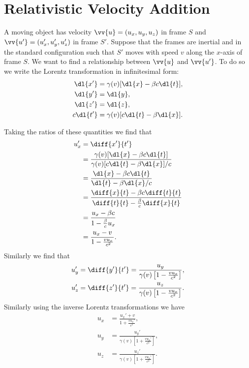 \documentclass[fleqn]{NotesClass}
\begin{document}
    \section{Relativistic Velocity Addition}\label{sec:relativisitic velocity addition}
    A moving object has velocity \(\vv{u} = (u_x, u_y, u_z)\) in frame \(S\) and \(\vv{u'} = (u'_x, u'_y, u'_z)\) in frame \(S'\).
    Suppose that the frames are inertial and in the standard configuration such that \(S'\) moves with speed \(v\) along the \(x\)-axis of frame \(S\).
    We want to find a relationship between \(\vv{u}\) and \(\vv{u'}\).
    To do so we write the Lorentz transformation in infinitesimal form:
    \begin{align}
        \dl{x'} &= \gamma(v)[\dl{x} - \beta c \dl{t}],\\
        \dl{y'} &= \dl{y},\\
        \dl{z'} &= \dl{z},\\
        c\dl{t'} &= \gamma(v)[c\dl{t} - \beta\dl{x}].
    \end{align}
    
    Taking the ratios of these quantities we find that
    \begin{align}
        u'_x &= \diff{x'}{t'}\\
        &= \frac{\gamma(v)[\dl{x} - \beta c \dl{t}]}{\gamma(v)[c\dl{t} - \beta\dl{x}]/c}\\
        &= \frac{\dl{x} - \beta c \dl{t}}{\dl{t} - \beta \dl{x}/c}\\
        &= \frac{\diff{x}{t} - \beta c \diff{t}{t}}{\diff{t}{t} - \frac{\beta}{c}\diff{x}{t}}\\
        &= \frac{u_x - \beta c}{1 - \frac{\beta}{c}u_x}\\
        &= \frac{u_x - v}{1 - \frac{v u_x}{c^2}}.\label{eqn:3-velocity addition}
    \end{align}
    Similarly we find that
    \begin{align}
        u_y' &= \diff{y'}{t'} = \frac{u_y}{\gamma(v)\left[ 1 -  \frac{vu_x}{c^2}\right]},\\
        u_z' &= \diff{z'}{t'} = \frac{u_z}{\gamma(v)\left[ 1 -  \frac{vu_x}{c^2}\right]}.
    \end{align}
    Similarly using the inverse Lorentz transformations we have
    \begin{align}
        u_x &= \frac{u_x' + v}{1 + \frac{vu_x'}{c^2}},\\
        u_y &= \frac{u_y'}{\gamma(v)\left[ 1 + \frac{vu_x'}{c^2} \right]},\\
        u_z &= \frac{u_z'}{\gamma(v)\left[ 1 + \frac{vu_x'}{c^2} \right]}.
    \end{align}
    
\end{document}
